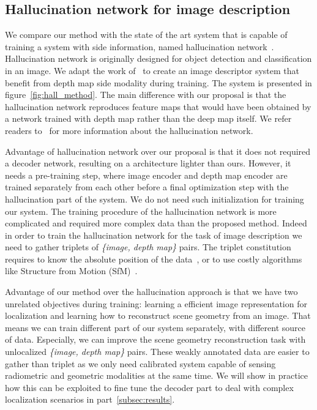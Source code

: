 \subsection{Hallucination network for image description}
\label{subsec:hall}
We compare our method with the state of the art system that is capable of training a system with side information, named hallucination network~\cite{Hoffman2016}. Hallucination network is originally designed for object detection and classification in an image. We adapt the work of~\cite{Hoffman2016} to create an image descriptor system that benefit from depth map side modality during training. The system is presented in figure~\ref{fig:hall_method}. The main difference with our proposal is that the hallucination network reproduces feature maps that would have been obtained by a network trained with depth map rather than the deep map itself. We refer readers to~\cite{Hoffman2016} for more information about the hallucination network.

Advantage of hallucination network over our proposal is that it does not required a decoder network, resulting on a architecture lighter than ours. However, it needs a pre-training step, where image encoder and depth map encoder are trained separately from each other before a final optimization step with the hallucination part of the system. We do not need such initialization for training our system. The training procedure of the hallucination network is more complicated and required more complex data than the proposed method. Indeed in order to train the hallucination network for the task of image description we need to gather triplets of \textit{\{image, depth map\}} pairs. The triplet constitution requires to know the absolute position of the data~\cite{Arandjelovic2017,Liu2018}, or to use costly algorithms like Structure from Motion (SfM)~\cite{Godard2017,Radenovic2017,Kim2017a}. 

Advantage of our method over the hallucination approach is that we have two unrelated objectives during training: learning a efficient image representation for localization and learning how to reconstruct scene geometry from an image. That means we can train different part of our system separately, with different source of data. Especially, we can improve the scene geometry reconstruction task with unlocalized \textit{\{image, depth map\}} pairs. These weakly annotated data are easier to gather than triplet as we only need calibrated system capable of sensing radiometric and geometric modalities at the same time. We will show in practice how this can be exploited to fine tune the decoder part to deal with complex localization scenarios in part~\ref{subsec:results}.

